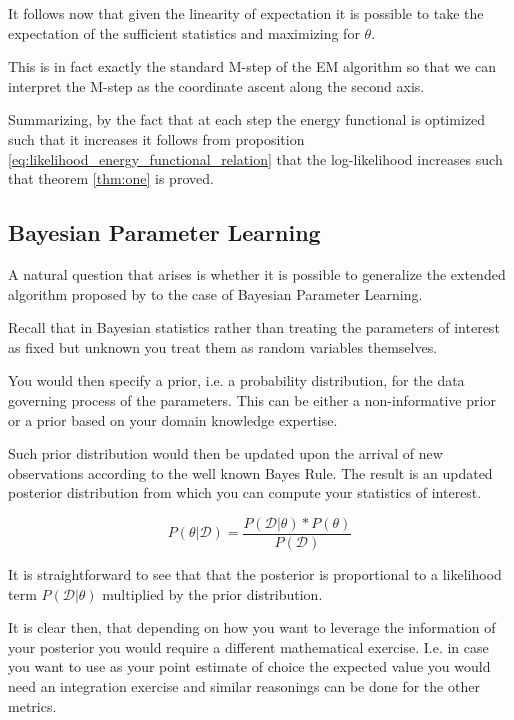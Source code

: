 \documentclass[11pt]{article}
\begin{document}
\begin{article}
It follows now that given the linearity of expectation it is
possible to take the expectation of the sufficient statistics and
maximizing for \(\theta\).

This is in fact exactly the standard M-step of the EM algorithm so
that we can interpret the M-step as the coordinate ascent along
the second axis. 

Summarizing, by the fact that at each step the energy functional is
optimized such that it increases it follows from proposition
\ref{eq:likelihood_energy_functional_relation} that the
log-likelihood increases such that theorem \ref{thm:one} is proved.


\subsection{Bayesian Parameter Learning}
\label{bayes-parameter-learning}
A natural question that arises is whether it is possible to
generalize the extended algorithm proposed by \cite{Mrad_2015} to the
case of Bayesian Parameter Learning.

Recall that in Bayesian statistics rather than treating the
parameters of interest as fixed but unknown you treat them as random
variables themselves.

You would then specify a prior, i.e. a probability distribution, for
the data governing process of the parameters. This can be either a
non-informative prior or a prior based on your domain knowledge
expertise.

Such prior distribution would then be updated upon the arrival of
new observations according to the well known Bayes Rule. The result
is an updated posterior distribution from which you can compute your
statistics of interest.


\begin{equation} \label{eq:bayes_formula}
P (\theta | \mathscr{D}) = \frac{P (\mathscr{D} | \theta) * P(\theta)}{P (\mathscr{D})} 
\end{equation}

It is straightforward to see that that the posterior is proportional
to a likelihood term \(P (\mathscr{D} | \theta)\) multiplied by the
prior distribution.

It is clear then, that depending on how you want to leverage the
information of your posterior you would require a different
mathematical exercise. I.e. in case you want to use as your
point estimate of choice the expected value you would need an
integration exercise and similar reasonings can be done for the
other metrics.


\end{article}
\end{document}
